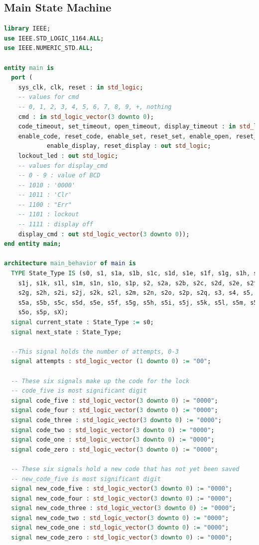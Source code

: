 \documentclass[11pt]{article}
\begin{document}
\begin{appendices}
\subsection{Main State Machine}

\begin{lstlisting}[language=VHDL]
library IEEE;
use IEEE.STD_LOGIC_1164.ALL;
use IEEE.NUMERIC_STD.ALL;

entity main is
  port (
    sys_clk, clk, reset : in std_logic;
    -- values for cmd
    -- 0, 1, 2, 3, 4, 5, 6, 7, 8, 9, +, nothing
    cmd : in std_logic_vector(3 downto 0);
    code_timeout, set_timeout, open_timeout, display_timeout : in std_logic;
    enable_code, reset_code, enable_set, reset_set, enable_open, reset_open, 
    		enable_display, reset_display : out std_logic;
    lockout_led : out std_logic;
    -- values for display_cmd
    -- 0 - 9 : value of BCD
    -- 1010 : '0000'
    -- 1011 : 'Clr'
    -- 1100 : "Err"
    -- 1101 : lockout
    -- 1111 : display off
    display_cmd : out std_logic_vector(3 downto 0));
end entity main;

architecture main_behavior of main is
  TYPE State_Type IS (s0, s1, s1a, s1b, s1c, s1d, s1e, s1f, s1g, s1h, s1i,
    s1j, s1k, s1l, s1m, s1n, s1o, s1p, s2, s2a, s2b, s2c, s2d, s2e, s2f,
    s2g, s2h, s2i, s2j, s2k, s2l, s2m, s2n, s2o, s2p, s2q, s3, s4, s5,
    s5a, s5b, s5c, s5d, s5e, s5f, s5g, s5h, s5i, s5j, s5k, s5l, s5m, s5n,
    s5o, s5p, sX);
  signal current_state : State_Type := s0;
  signal next_state : State_Type;

  --This signal holds the number of attempts, 0-3
  signal attempts : std_logic_vector (1 downto 0) := "00";

  -- These six signals make up the code for the lock
  -- code_five is most significant digit
  signal code_five : std_logic_vector(3 downto 0) := "0000";
  signal code_four : std_logic_vector(3 downto 0) := "0000";
  signal code_three : std_logic_vector(3 downto 0) := "0000";
  signal code_two : std_logic_vector(3 downto 0) := "0000";
  signal code_one : std_logic_vector(3 downto 0) := "0000";
  signal code_zero : std_logic_vector(3 downto 0) := "0000";

  -- These six signals hold a new code that has not yet been saved
  -- new_code_five is most significant digit
  signal new_code_five : std_logic_vector(3 downto 0) := "0000";
  signal new_code_four : std_logic_vector(3 downto 0) := "0000";
  signal new_code_three : std_logic_vector(3 downto 0) := "0000";
  signal new_code_two : std_logic_vector(3 downto 0) := "0000";
  signal new_code_one : std_logic_vector(3 downto 0) := "0000";
  signal new_code_zero : std_logic_vector(3 downto 0) := "0000";


\end{lstlisting}
\end{appendices}
\end{document}
